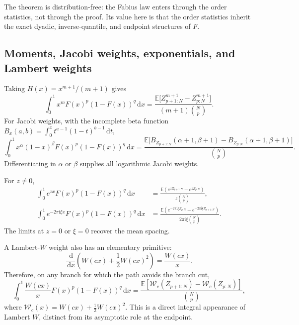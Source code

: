\documentclass[11pt,oneside]{article}
\theoremstyle{definition}
\theoremstyle{remark}
\newcommand{\F}{F}
\newcommand{\E}{\mathbb E}
\newcommand{\dd}{\,\mathrm d}
\newcommand{\ii}{\mathrm i}
\begin{document}
The theorem is distribution-free: the Fabius law enters through the order
statistics, not through the proof.  Its value here is that the order statistics
inherit the exact dyadic, inverse-quantile, and endpoint structures of \(\F\).

\subsection{Moments, Jacobi weights, exponentials, and Lambert weights}

Taking \(H(x)=x^{m+1}/(m+1)\) gives
\begin{equation}\label{eq:weightedmomspacing}
 \int_0^1x^m\F(x)^p(1-\F(x))^q\dd x
 =\frac{\E\bigl[Z_{p+1:N}^{m+1}-Z_{p:N}^{m+1}\bigr]}
 {(m+1)\binom Np}.
\end{equation}
For Jacobi weights, with the incomplete beta function
\(B_x(a,b)=\int_0^xt^{a-1}(1-t)^{b-1}\dd t\),
\begin{equation}\label{eq:jacobispacing}
 \int_0^1x^\alpha(1-x)^\beta\F(x)^p(1-\F(x))^q\dd x
 =\frac{\E\bigl[B_{Z_{p+1:N}}(\alpha+1,\beta+1)
                    -B_{Z_{p:N}}(\alpha+1,\beta+1)\bigr]}
 {\binom Np}.
\end{equation}
Differentiating in \(\alpha\) or \(\beta\) supplies all logarithmic Jacobi
weights.

For \(z\ne0\),
\begin{align}
 \int_0^1e^{zx}\F(x)^p(1-\F(x))^q\dd x
 &=\frac{\E(e^{zZ_{p+1:N}}-e^{zZ_{p:N}})}
 {z\binom Np},\label{eq:expspacing}\\
 \int_0^1e^{-2\pi\ii\xi x}\F(x)^p(1-\F(x))^q\dd x
 &=\frac{\E(e^{-2\pi\ii\xi Z_{p:N}}-e^{-2\pi\ii\xi Z_{p+1:N}})}
 {2\pi\ii\xi\binom Np}.\label{eq:fourierspacing}
\end{align}
The limits at \(z=0\) or \(\xi=0\) recover the mean spacing.

A Lambert-\(W\) weight also has an elementary primitive:
\begin{equation}
 \frac{\dd}{\dd x}
 \left(W(cx)+\frac12W(cx)^2\right)=\frac{W(cx)}{x}.
\end{equation}
Therefore, on any branch for which the path avoids the branch cut,
\begin{equation}\label{eq:lambertweight}
 \int_0^1\frac{W(cx)}x\F(x)^p(1-\F(x))^q\dd x
 =\frac{\E[\mathcal W_c(Z_{p+1:N})-\mathcal W_c(Z_{p:N})]}
 {\binom Np},
\end{equation}
where \(\mathcal W_c(x)=W(cx)+\tfrac12W(cx)^2\).  This is a direct integral
appearance of Lambert \(W\), distinct from its asymptotic role at the endpoint.
\end{document}
